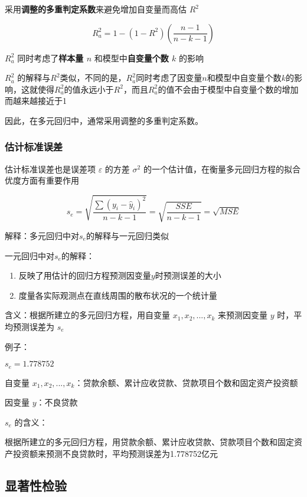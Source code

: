 \documentclass[UTF8,10pt]{book}
\begin{document}
采用\textbf{调整的多重判定系数}来避免增加自变量而高估 \(R^2\)

\[R_a^2 =1-(1-R^2)(\frac{n-1}{n-k-1})\]

\(R_a^2\) 同时考虑了\textbf{样本量 \( n\) }和模型中\textbf{自变量个数
	\(k\) }的影响

\(R_a^2\)
的解释与\(R^2\)类似，不同的是，\(R_a^2\)同时考虑了因变量\(n\)和模型中自变量个数\(k\)的影响，这就使得\(R_a^2\)的值永远小于\(R^2\)，而且\(R_a^2\)的值不会由于模型中自变量个数的增加而越来越接近于1

因此，在多元回归中，通常采用调整的多重判定系数。

\subsubsection{估计标准误差}\label{header-n210}

估计标准误差也是误差项 \(\varepsilon\) 的方差 \( \sigma^2 \)
的一个估计值，在衡量多元回归方程的拟合优度方面有重要作用

\[s_{e}=\sqrt{\frac{\sum\left(y_{i}-\hat{y}_{i}\right)^{2}}{n-k-1}}=\sqrt{\frac{S S E}{n-k-1}}=\sqrt{M S E}\]

解释：多元回归中对\(s_e\)的解释与一元回归类似

一元回归中对\(s_e\)的解释：

\begin{enumerate}
	\def\labelenumi{\arabic{enumi}.}
	\item
	反映了用估计的回归方程预测因变量\(y\)时预测误差的大小
	\item
	度量各实际观测点在直线周围的散布状况的一个统计量
\end{enumerate}

含义：根据所建立的多元回归方程，用自变量 \(x_1,x_2,...,x_k\)
来预测因变量 \(y\) 时，平均预测误差为 \(s_e\)

例子：

\(s_e = 1.778752\)

自变量
\(x_1,x_2,...,x_k\)：贷款余额、累计应收贷款、贷款项目个数和固定资产投资额

因变量 \(y\)：不良贷款

\(s_e\) 的含义：

根据所建立的多元回归方程，用贷款余额、累计应收贷款、贷款项目个数和固定资产投资额来预测不良贷款时，平均预测误差为1.778752亿元

\subsection{显著性检验}\label{header-n228}
\end{document}
